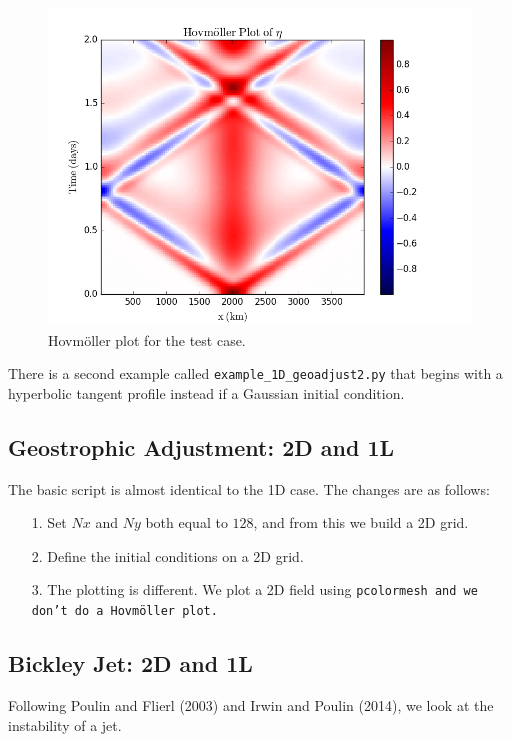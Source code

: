 \documentclass[11pt]{article}
\begin{document}
\begin{figure}[h]
\begin{center}
\includegraphics[width=12cm]{Figures/ex1_fig2.png}
\caption{Hovm\"oller plot for the test case.}
\end{center}
\end{figure}

There is a second example called {\tt example\_1D\_geoadjust2.py} that begins with a hyperbolic tangent profile instead if a Gaussian initial condition.

\subsection*{Geostrophic Adjustment: 2D and 1L}

The basic script is almost identical to the 1D case.  The changes are as follows:
\begin{itemize}
\item[1.] Set $Nx$ and $Ny$ both equal to $128$, and from this we build a 2D grid.   
\item[2.] Define the initial conditions on a 2D grid.
\item[3.] The plotting is different.  We plot a 2D field using \tt{pcolormesh} and we don't do a Hovm\"oller plot.
\end{itemize}

\subsection*{Bickley Jet: 2D and 1L}

Following Poulin and Flierl (2003) and Irwin and Poulin (2014), we look at the instability of a jet.
\end{document}
